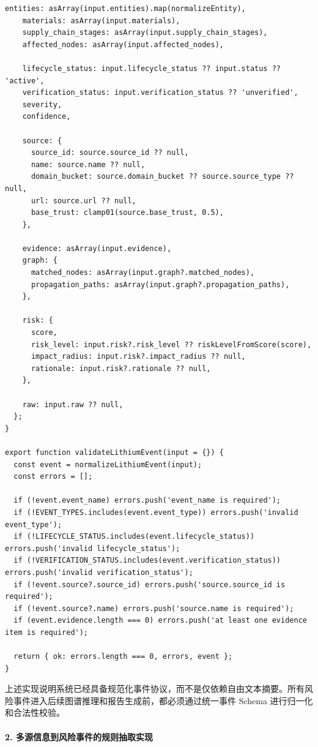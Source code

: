 ﻿\documentclass[12pt,a4paper]{article}
\begin{document}
\begin{lstlisting}[style=projectcode,caption={风险事件标准化与 Schema 校验核心实现}]
    entities: asArray(input.entities).map(normalizeEntity),
    materials: asArray(input.materials),
    supply_chain_stages: asArray(input.supply_chain_stages),
    affected_nodes: asArray(input.affected_nodes),

    lifecycle_status: input.lifecycle_status ?? input.status ?? 'active',
    verification_status: input.verification_status ?? 'unverified',
    severity,
    confidence,

    source: {
      source_id: source.source_id ?? null,
      name: source.name ?? null,
      domain_bucket: source.domain_bucket ?? source.source_type ?? null,
      url: source.url ?? null,
      base_trust: clamp01(source.base_trust, 0.5),
    },

    evidence: asArray(input.evidence),
    graph: {
      matched_nodes: asArray(input.graph?.matched_nodes),
      propagation_paths: asArray(input.graph?.propagation_paths),
    },

    risk: {
      score,
      risk_level: input.risk?.risk_level ?? riskLevelFromScore(score),
      impact_radius: input.risk?.impact_radius ?? null,
      rationale: input.risk?.rationale ?? null,
    },

    raw: input.raw ?? null,
  };
}

export function validateLithiumEvent(input = {}) {
  const event = normalizeLithiumEvent(input);
  const errors = [];

  if (!event.event_name) errors.push('event_name is required');
  if (!EVENT_TYPES.includes(event.event_type)) errors.push('invalid event_type');
  if (!LIFECYCLE_STATUS.includes(event.lifecycle_status)) errors.push('invalid lifecycle_status');
  if (!VERIFICATION_STATUS.includes(event.verification_status)) errors.push('invalid verification_status');
  if (!event.source?.source_id) errors.push('source.source_id is required');
  if (!event.source?.name) errors.push('source.name is required');
  if (event.evidence.length === 0) errors.push('at least one evidence item is required');

  return { ok: errors.length === 0, errors, event };
}
\end{lstlisting}

上述实现说明系统已经具备规范化事件协议，而不是仅依赖自由文本摘要。所有风险事件进入后续图谱推理和报告生成前，都必须通过统一事件 Schema 进行归一化和合法性校验。

\paragraph{2. 多源信息到风险事件的规则抽取实现}
\end{document}

